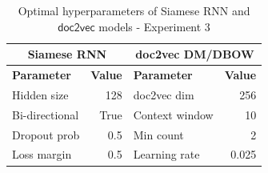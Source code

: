 \documentclass{sigkddExp}
\begin{document}
\begin{table}[b]
 \begin{tabular}{l|r|l|r}
          \multicolumn{2}{c|}{\textbf{Siamese RNN}}
         & \multicolumn{2}{c}{\textbf{\textsf{doc2vec DM/DBOW}}}
         \\
         \toprule
         \textbf{Parameter}
         & \textbf{Value}
         & \textbf{Parameter}
         & \textbf{Value}
         \\
         \midrule
         Hidden size
         & 128
         & \textsf{doc2vec} dim
         & 256
         \\
         Bi-directional
         & True
         & Context window
         & 10
         \\
         Dropout prob
         & 0.5
         & Min count
         & 2
         \\
         Loss margin
         & 0.5
         & Learning rate
         & 0.025
    \end{tabular}
    \caption{Optimal hyperparameters of Siamese RNN and $\mathsf{doc2vec}$ models - Experiment 3}
    \label{tab:part3_params}
\end{table}
\end{document}
